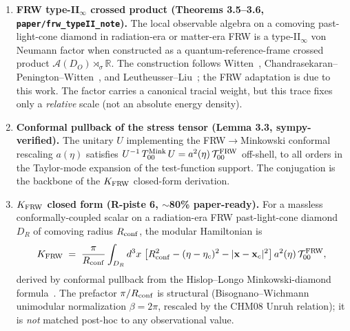 \begin{enumerate}

\item \textbf{FRW type-II$_\infty$ crossed product (Theorems 3.5--3.6,
  \texttt{paper/frw\_typeII\_note}).}
  The local observable algebra on a comoving past-light-cone diamond in
  radiation-era or matter-era FRW is a type-II$_\infty$ von Neumann factor
  when constructed as a quantum-reference-frame crossed product $\mathcal{A}(D_O)
  \rtimes_\sigma \mathbb{R}$.  The construction follows Witten~\cite{Witten2022},
  Chandrasekaran--Penington--Witten~\cite{Chandrasekaran2023}, and
  Leutheusser--Liu~\cite{Leutheusser2022}; the FRW adaptation is due to this
  work.  The factor carries a canonical tracial weight, but this trace fixes
  only a \emph{relative} scale (not an absolute energy density).

\item \textbf{Conformal pullback of the stress tensor (Lemma 3.3,
  sympy-verified).}
  The unitary $U$ implementing the FRW$\to$Minkowski conformal rescaling
  $a(\eta)$ satisfies $U^{-1}\,T^{\rm Mink}_{00}\,U = a^2(\eta)\,
  \mathcal{T}^{\rm FRW}_{00}$ off-shell, to all orders in the Taylor-mode
  expansion of the test-function support.  The conjugation is the
  backbone of the $K_{\rm FRW}$ closed-form derivation.

\item \textbf{$K_{\rm FRW}$ closed form (R-piste 6, $\sim$80\% paper-ready).}
  For a massless conformally-coupled scalar on a radiation-era FRW
  past-light-cone diamond $D_R$ of comoving radius $R_{\rm conf}$,
  the modular Hamiltonian is
  \begin{equation}
    K_{\rm FRW} \;=\; \frac{\pi}{R_{\rm conf}}
    \int_{D_R} d^3x\;
    \bigl[R_{\rm conf}^2 - (\eta - \eta_c)^2 - |\mathbf{x}-\mathbf{x}_c|^2\bigr]\,
    a^2(\eta)\,\mathcal{T}^{\rm FRW}_{00},
    \label{eq:kfrw}
  \end{equation}
  derived by conformal pullback from the Hislop--Longo
  Minkowski-diamond formula~\cite{HislopLongo1982}.  The prefactor
  $\pi/R_{\rm conf}$ is structural (Bisognano--Wichmann unimodular
  normalization $\beta=2\pi$, rescaled by the CHM08 Unruh relation); it is
  \emph{not} matched post-hoc to any observational value.


\end{enumerate}
